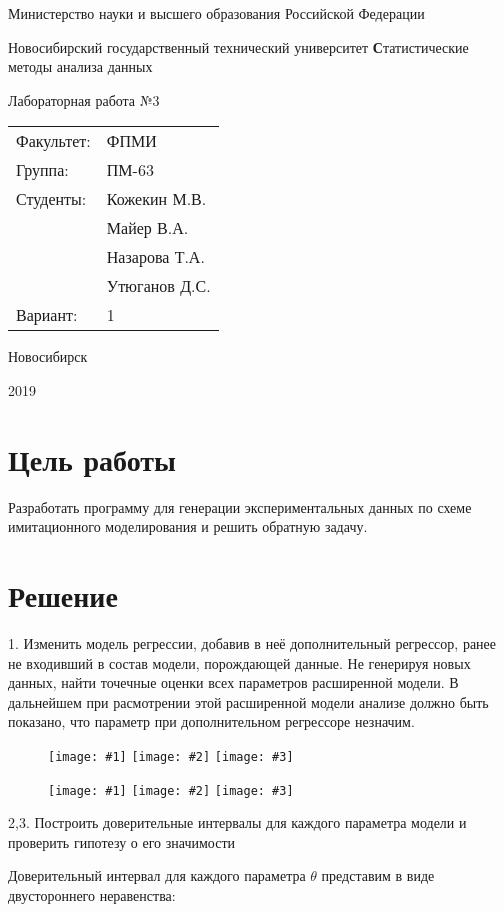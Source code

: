 ﻿\documentclass[12pt, a4paper]{article}
\newcommand{\insertTitle}[9]{
\begin{titlepage}
	\begin{center}
    	\large
		Министерство науки и высшего образования Российской Федерации
		
		Новосибирский государственный технический университет
		\vfill
		{\textbf #1}
		
		Лабораторная работа №#2
		\vfill
	\end{center}
	
	\begin{tabular}{ m{7em}  m{7em} }
	Факультет: & ФПМИ \\ 
	Группа: & #3 \\  
	Студенты: & #4 \\
			   & #5 \\
			   & #6 \\
			   & #7 \\	
	Вариант: & #8
	\end{tabular}
	\vfill

\begin{center}
Новосибирск

#9
\end{center}
\end{titlepage}
}
\newcommand{\inputThreeImages}[3]{
\begin{figure}[htbp!]
    \noindent
        \texttt{[image: \#1]}
        \texttt{[image: \#2]}
        \texttt{[image: \#3]}
\end{figure}
}
\begin{document}
\setlength{\abovedisplayskip}{1pt}
\setlength{\belowdisplayskip}{1pt}



\insertTitle{Статистические методы анализа данных}{3}{ПМ-63}{Кожекин М.В.}{Майер В.А.}{Назарова Т.А.}{Утюганов Д.С.}{1}{2019}




\section{Цель работы}
Разработать программу для генерации экспериментальных данных по схеме имитационного моделирования и решить обратную задачу.




\section{Решение}

1.	Изменить модель регрессии, добавив в неё дополнительный регрессор, ранее не входивший в состав модели, порождающей данные.
Не генерируя новых данных, найти точечные оценки всех параметров расширенной модели. В дальнейшем при расмотрении этой расширенной
модели анализе должно быть показано, что параметр при дополнительном регрессоре незначим.

\inputThreeImages{../../1/pics/before_15_0_0.png}{../../1/pics/before_15_0_90.png}{../../1/pics/before_15_None_None.png}

\inputThreeImages{../../1/pics/after_15_0_0.png}{../../1/pics/after_15_0_90.png}{../../1/pics/after_15_None_None.png}


2,3. Построить доверительные интервалы для каждого параметра модели и проверить гипотезу о его значимости

Доверительный интервал для каждого параметра $\theta$ представим в виде двустороннего неравенства:
\end{document}
